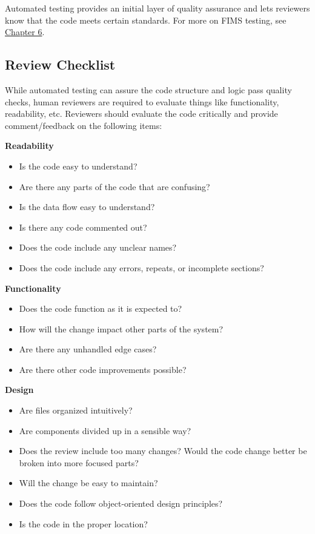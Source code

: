 \documentclass[
]{book}
\providecommand{\tightlist}{%
  \setlength{\itemsep}{0pt}\setlength{\parskip}{0pt}}
\begin{document}
Automated testing provides an initial layer of quality assurance and lets reviewers know that the code meets certain standards. For more on FIMS testing, see \href{https://noaa-fims.github.io/collaborative_workflow/test-case-template.html}{Chapter 6}.

\hypertarget{review-checklist}{%
\subsection{Review Checklist}\label{review-checklist}}

While automated testing can assure the code structure and logic pass quality checks, human reviewers are required to evaluate things like functionality, readability, etc. Reviewers should evaluate the code critically and provide comment/feedback on the following items:

\textbf{Readability}

\begin{itemize}
\tightlist
\item
  Is the code easy to understand?
\item
  Are there any parts of the code that are confusing?
\item
  Is the data flow easy to understand?
\item
  Is there any code commented out?
\item
  Does the code include any unclear names?
\item
  Does the code include any errors, repeats, or incomplete sections?
\end{itemize}

\textbf{Functionality}

\begin{itemize}
\tightlist
\item
  Does the code function as it is expected to?
\item
  How will the change impact other parts of the system?
\item
  Are there any unhandled edge cases?
\item
  Are there other code improvements possible?
\end{itemize}

\textbf{Design}

\begin{itemize}
\tightlist
\item
  Are files organized intuitively?
\item
  Are components divided up in a sensible way?
\item
  Does the review include too many changes? Would the code change better be broken into more focused parts?
\item
  Will the change be easy to maintain?
\item
  Does the code follow object-oriented design principles?
\item
  Is the code in the proper location?
\end{itemize}
\end{document}

